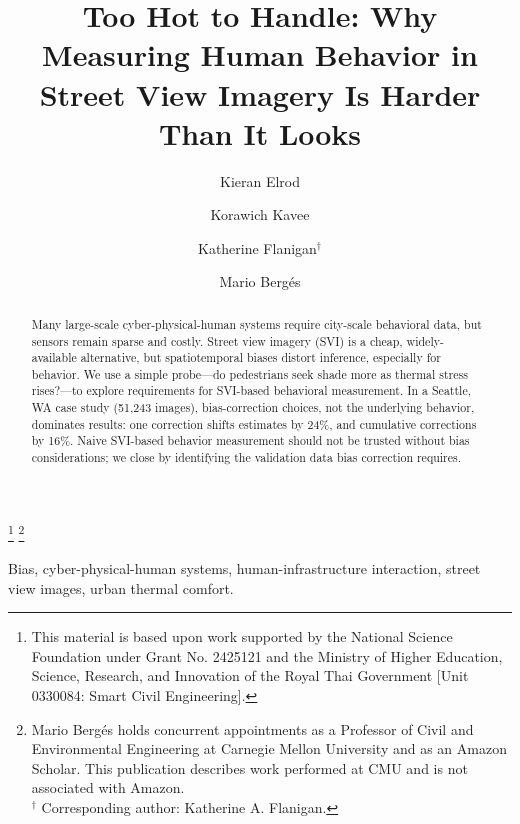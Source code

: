 \documentclass{ifacconf}
\begin{document}
\begin{frontmatter}

\title{Too Hot to Handle: Why Measuring Human Behavior in Street View Imagery Is Harder Than It Looks}
\thanks[footnoteinfo]{This material is based upon work supported by the National Science
Foundation under Grant No. 2425121 and the Ministry of Higher Education, Science, Research, and Innovation of the Royal Thai Government [Unit 0330084: Smart Civil Engineering].}
\thanks[footnoteinfo]{Mario Bergés holds concurrent appointments as a Professor of Civil and Environmental Engineering at Carnegie Mellon University and as an Amazon Scholar. This publication describes work performed at CMU and is not associated with Amazon.\\$^\dagger$ Corresponding author: Katherine A. Flanigan.}
\author[First]{Kieran Elrod}
\author[First]{Korawich Kavee}
\author[First]{Katherine Flanigan$^\dagger$}
\author[First]{Mario Bergés}

\address[First]{Department of Civil \& Environmental Engineering, Carnegie Mellon University, 5000 Forbes Ave., Pittsburgh, PA 15213 (e-mails: kelrod@andrew.cmu.edu, kkavee@andrew.cmue.edu, kflaniga@andrew.cmu.edu, mberges@andrew.cmu.edu).}

\begin{abstract}



Many large-scale cyber-physical-human systems require city-scale behavioral data, but sensors remain sparse and costly. Street view imagery (SVI) is a cheap, widely-available alternative, but spatiotemporal biases distort inference, especially for behavior. We use a simple probe---do pedestrians seek shade more as thermal stress rises?---to explore requirements for SVI-based behavioral measurement. In a Seattle, WA case study (51,243 images), bias-correction choices, not the underlying behavior, dominates results: one correction shifts estimates by 24\%, and cumulative corrections by 16\%. Naive SVI-based behavior measurement should not be trusted without bias considerations; we close by identifying the validation data bias correction requires.

\end{abstract}

\begin{keyword}
Bias, cyber-physical-human systems, human-infrastructure interaction, street view images, urban thermal comfort.
\end{keyword}

\end{frontmatter}
\maketitle
\end{document}

